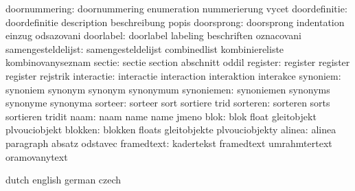       doornummering:  doornummering        enumeration         nummerierung
                      vycet
      doordefinitie:  doordefinitie        description         beschreibung
                      popis
         doorsprong:  doorsprong           indentation         einzug
                      odsazovani
          doorlabel:  doorlabel            labeling            beschriften
                      oznacovani
 samengesteldelijst:  samengesteldelijst   combinedlist        kombiniereliste
                      kombinovanyseznam
             sectie:  sectie               section             abschnitt
                      oddil
           register:  register             register            register
                      rejstrik
         interactie:  interactie           interaction          interaktion
                      interakce
           synoniem:  synoniem             synonym             synonym
                      synonymum
         synoniemen:  synoniemen           synonyms            synonyme
                      synonyma
            sorteer:  sorteer              sort                sortiere
                      trid
           sorteren:  sorteren             sorts               sortieren
                      tridit
               naam:  naam                 name                name
                      jmeno
               blok:  blok                 float               gleitobjekt 
                      plvouciobjekt
            blokken:  blokken              floats              gleitobjekte 
                      plvouciobjekty
             alinea:  alinea               paragraph           absatz
                      odstavec 
         framedtext:  kadertekst           framedtext          umrahmtertext
                      oramovanytext

\stopsetupvariables




\startelements        dutch                english             german
                      czech

